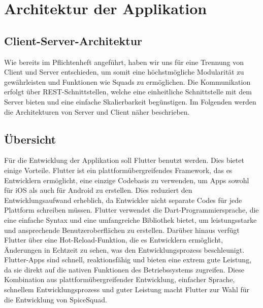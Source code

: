 \documentclass[parskip=full]{scrartcl}
\begin{document}
\section{Architektur der Applikation}

\subsection{Client-Server-Architektur}
Wie bereits im Pflichtenheft angeführt, haben wir uns für eine Trennung von Client und Server entschieden, um somit eine höchstmögliche Modularität zu gewährleisten und
Funktionen wie Squads zu ermöglichen. Die Kommunikation erfolgt über REST-Schnittstellen, welche eine einheitliche Schnittstelle mit dem Server bieten und eine einfache Skalierbarkeit begünstigen.
Im Folgenden werden die Architekturen von Server und Client näher beschrieben.

\subsection{Übersicht}
Für die Entwicklung der Applikation soll Flutter benutzt werden. Dies bietet einige Vorteile. Flutter ist ein plattformübergreifendes Framework, das es Entwicklern ermöglicht, eine einzige Codebasis zu verwenden, um Apps sowohl für iOS als auch für Android zu erstellen. Dies reduziert den Entwicklungsaufwand erheblich, da Entwickler nicht separate Codes für jede Plattform schreiben müssen. Flutter verwendet die Dart-Programmiersprache, die eine einfache Syntax und eine umfangreiche Bibliothek bietet, um leistungsstarke und ansprechende Benutzeroberflächen zu erstellen. Darüber hinaus verfügt Flutter über eine Hot-Reload-Funktion, die es Entwicklern ermöglicht, Änderungen in Echtzeit zu sehen, was den Entwicklungsprozess beschleunigt. Flutter-Apps sind schnell, reaktionsfähig und bieten eine extrem gute Leistung, da sie direkt auf die nativen Funktionen des Betriebssystems zugreifen. Diese Kombination aus plattformübergreifender Entwicklung, einfacher Sprache, schnellem Entwicklungsprozess und guter Leistung macht Flutter zur Wahl für die Entwicklung von SpiceSquad.
\end{document}
